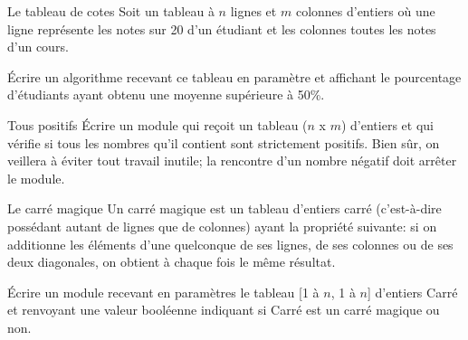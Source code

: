 \begin{Exercice}{Le tableau de cotes}
	Soit un tableau à $n$ lignes et $m$ colonnes d'entiers où
	une ligne représente les notes sur 20 d'un étudiant et
	les colonnes toutes les notes d'un cours.
	
	Écrire un algorithme recevant ce tableau en paramètre et affichant le
	pourcentage d'étudiants ayant obtenu une moyenne
	supérieure à 50\%.
\end{Exercice}

\begin{Exercice}{Tous positifs}
	Écrire un module qui reçoit un tableau ($n$ x $m$) d’entiers et qui vérifie
	si tous les nombres qu’il contient sont strictement positifs. Bien sûr,
	on veillera à éviter tout travail inutile; la rencontre d’un nombre
	négatif doit arrêter le module.
\end{Exercice}

\begin{Exercice}{Le carré magique}
	Un carré magique est un tableau d’entiers carré
	(c'est-à-dire possédant autant de lignes que de
	colonnes) ayant la propriété suivante: si on additionne les éléments
	d'une quelconque de ses lignes, de ses colonnes ou de
	ses deux diagonales, on obtient à chaque fois le même résultat.

	Écrire un module recevant en paramètres le tableau [1 à $n$, 1 à $n$]
	d'entiers Carré et renvoyant une valeur booléenne
	indiquant si Carré est un carré magique ou non.
\end{Exercice}


